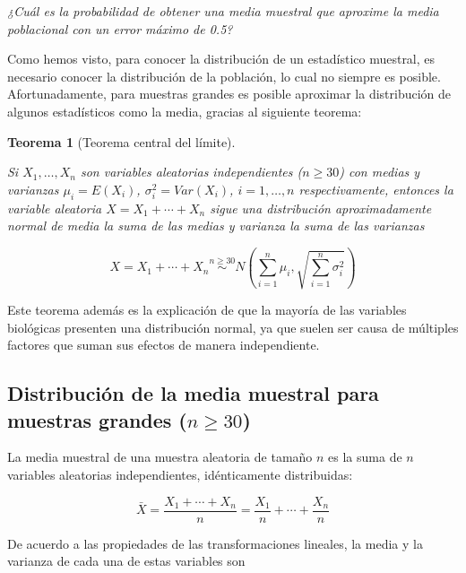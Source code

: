 \documentclass[
  a4paper,
]{scrreport}
\theoremstyle{definition}
\theoremstyle{definition}
\theoremstyle{plain}
\newtheorem{theorem}{Teorema}[chapter]
\theoremstyle{remark}
\begin{document}
\emph{¿Cuál es la probabilidad de obtener una media muestral que
aproxime la media poblacional con un error máximo de 0.5?}

Como hemos visto, para conocer la distribución de un estadístico
muestral, es necesario conocer la distribución de la población, lo cual
no siempre es posible. Afortunadamente, para muestras grandes es posible
aproximar la distribución de algunos estadísticos como la media, gracias
al siguiente teorema:

\begin{theorem}[Teorema central del
límite]\protect\hypertarget{thm-teorema-central-limite}{}\label{thm-teorema-central-limite}

Si \(X_1,\ldots, X_n\) son variables aleatorias independientes
(\(n\geq 30\)) con medias y varianzas \(\mu_i=E(X_i)\),
\(\sigma^2_i=Var(X_i)\), \(i=1,\ldots,n\) respectivamente, entonces la
variable aleatoria \(X=X_1+\cdots+X_n\) sigue una distribución
aproximadamente normal de media la suma de las medias y varianza la suma
de las varianzas

\[
X=X_1+\cdots+X_n\stackrel{n\geq 30} \sim N\left(\sum_{i=1}^n \mu_i, \sqrt{\sum_{i=1}^n \sigma^2_i}\right)
\]

\end{theorem}

Este teorema además es la explicación de que la mayoría de las variables
biológicas presenten una distribución normal, ya que suelen ser causa de
múltiples factores que suman sus efectos de manera independiente.

\hypertarget{distribuciuxf3n-de-la-media-muestral-para-muestras-grandes-ngeq-30}{%
\subsection{\texorpdfstring{Distribución de la media muestral para
muestras grandes
(\(n\geq 30\))}{Distribución de la media muestral para muestras grandes (n\textbackslash geq 30)}}\label{distribuciuxf3n-de-la-media-muestral-para-muestras-grandes-ngeq-30}}

La media muestral de una muestra aleatoria de tamaño \(n\) es la suma de
\(n\) variables aleatorias independientes, idénticamente distribuidas:

\[
\bar X = \frac{X_1+\cdots+X_n}{n} = \frac{X_1}{n}+\cdots+\frac{X_n}{n}
\]

De acuerdo a las propiedades de las transformaciones lineales, la media
y la varianza de cada una de estas variables son
\end{document}
